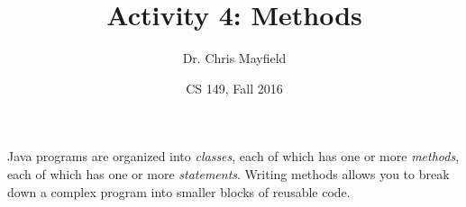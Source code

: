 \documentclass[12pt]{article}
\title{Activity 4: Methods}
\author{Dr. Chris Mayfield}
\date{CS 149, Fall 2016}
\begin{document}
\maketitle

Java programs are organized into {\em classes}, each of which has one or more {\em methods}, each of which has one or more {\em statements}.
Writing methods allows you to break down a complex program into smaller blocks of reusable code.




\end{document}
